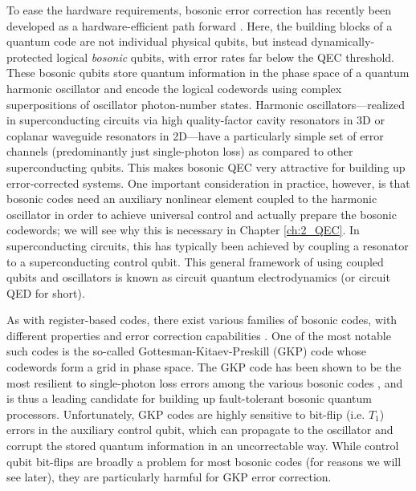 To ease the hardware requirements, bosonic error correction has recently been developed as a hardware-efficient path forward \cite{terhal2020bosonic, cai2021bosonic, joshi2021bosonic}. Here, the building blocks of a quantum code are not individual physical qubits, but instead dynamically-protected logical \textit{bosonic} qubits, with error rates far below the QEC threshold. These bosonic qubits store quantum information in the phase space of a quantum harmonic oscillator and encode the logical codewords using complex superpositions of oscillator photon-number states. Harmonic oscillators---realized in superconducting circuits via high quality-factor cavity resonators in 3D or coplanar waveguide resonators in 2D---have a particularly simple set of error channels (predominantly just single-photon loss) as compared to other superconducting qubits. This makes bosonic QEC very attractive for building up error-corrected systems. One important consideration in practice, however, is that bosonic codes need an auxiliary nonlinear element coupled to the harmonic oscillator in order to achieve universal control and actually prepare the bosonic codewords; we will see why this is necessary in Chapter \ref{ch:2_QEC}. In superconducting circuits, this has typically been achieved by coupling a resonator to a  superconducting control qubit. This general framework of using coupled qubits and oscillators is known as circuit quantum electrodynamics (or circuit QED for short). 

As with register-based codes, there exist various families of bosonic codes, with different properties and error correction capabilities \cite{joshi2021bosonic}. One of the most notable such codes is the so-called Gottesman-Kitaev-Preskill (GKP) code whose codewords form a grid in phase space. The GKP code has been shown to be the most resilient to single-photon loss errors among the various bosonic codes \cite{albert2018performance-and-structure, noh2018performance-and-structure-pt2}, and is thus a leading candidate for building up fault-tolerant bosonic quantum processors. Unfortunately, GKP codes are highly sensitive to bit-flip (i.e. $T_1$) errors in the auxiliary control qubit, which can propagate to the oscillator and corrupt the stored quantum information in an uncorrectable way. While control qubit bit-flips are broadly a problem for most bosonic codes (for reasons we will see later), they are particularly harmful for GKP error correction. 

